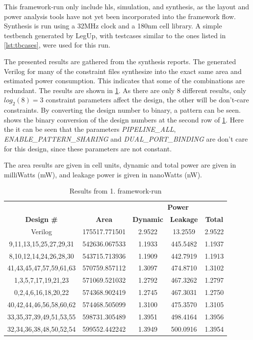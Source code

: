 This framework-run only include \gls{hls}, simulation, and synthesis, as the layout and power analysis tools have not yet been incorporated into the framework flow. Synthesis is run using a 32MHz clock and a 180nm cell library. A simple testbench generated by LegUp, with testcases similar to the ones listed in \cref{lst:tbcases}, were used for this run. 

The presented results are gathered from the synthesis reports. The generated Verilog for many of the constraint files synthesize into the exact same area and estimated power consumption. This indicates that some of the combinations are redundant. The results are shown in \cref{tab:hlsrun1dataresults}. As there are only 8 different results, only $log_2(8) = 3$ constraint parameters affect the design, the other will be don't-care constraints. By converting the design number to binary, a pattern can be seen.  shows the binary conversion of the design numbers at the second row of \cref{tab:hlsrun1dataresults}. Here the it can be seen that the parameters \textit{PIPELINE\_ALL}, \textit{ENABLE\_PATTERN\_SHARING} and \textit{DUAL\_PORT\_BINDING} are don't care for this design, since these parameters are not constant.

The area results are given in cell units, dynamic and total power are given in milliWatts (mW), and leakage power is given in nanoWatts (nW).


\begin{table}[hbtp]
    \centering
    \begin{tabular}{ccccc}
    & & \multicolumn{3}{c}{\textbf{Power}} \\
    \cline{3-5}
    \textbf{Design \#} & \textbf{Area} & \textbf{Dynamic} & \textbf{Leakage} & \textbf{Total} \\
    \toprule
    Verilog & 175517.771501 & 2.9522 & 13.2559 & 2.9522 \\
    9,11,13,15,25,27,29,31 & 542636.067533 & 1.1933 & 445.5482 & 1.1937 \\
    8,10,12,14,24,26,28,30 & 543715.713936 & 1.1909 & 442.7919 & 1.1913 \\
    41,43,45,47,57,59,61,63 & 570759.857112 & 1.3097 & 474.8710 & 1.3102 \\
    1,3,5,7,17,19,21,23 & 571069.521032 & 1.2792 & 467.3262 & 1.2797 \\
    0,2,4,6,16,18,20,22 & 574368.902419 & 1.2745 & 467.3031 & 1.2750 \\
    40,42,44,46,56,58,60,62 & 574468.505099 & 1.3100 & 475.3570 & 1.3105 \\
    33,35,37,39,49,51,53,55 & 598731.305489 & 1.3951 & 498.4164 & 1.3956 \\
    32,34,36,38,48,50,52,54 & 599552.442242 & 1.3949 & 500.0916 & 1.3954 \\
    \bottomrule
    \end{tabular}
    \caption{Results from 1. framework-run}
    \label{tab:hlsrun1dataresults}
\end{table}

